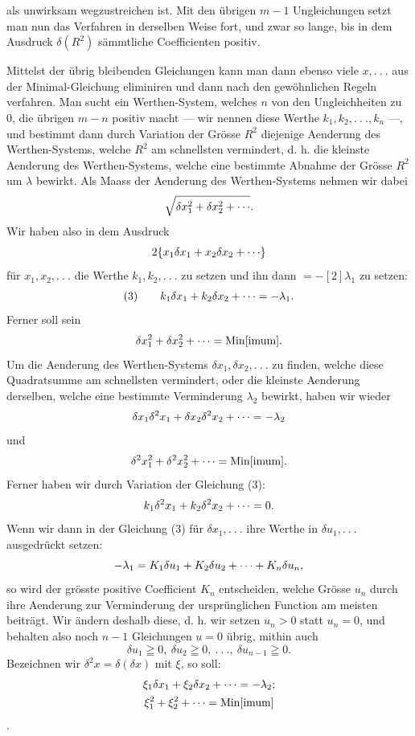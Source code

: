 \clearpage{}
\noindent als unwirksam wegzustreichen ist. Mit den übrigen \(m-1\) Ungleichungen setzt man nun das Verfahren in derselben Weise fort, und zwar so lange, bis in dem Ausdruck \(\delta(R^2)\) sämmtliche Coefficienten positiv.

\indent Mittelst der übrig bleibenden Gleichungen kann man dann ebenso viele \(x,.\ .\ .\) aus der Minimal-Gleichung eliminiren und dann nach den gewöhnlichen Regeln verfahren. Man sucht ein Werthen-System, welches \(n\) von den Ungleichheiten zu 0, die übrigen \(m-n\) positiv macht — wir nennen diese Werthe \(k_1,k_2,.\ .\ .,k_n\) —, und bestimmt dann durch Variation der Grösse \(R^2\) diejenige Aenderung des Werthen-Systems, welche \(R^2\) am schnellsten vermindert, d. h. die kleinste Aenderung des Werthen-Systems, welche eine bestimmte Abnahme der Grösse \(R^2\) um \(\lambda\) bewirkt. Als Maass der Aenderung des Werthen-Systems nehmen wir dabei
\[
\sqrt{\delta x_1^2+\delta x_2^2+\mathinner{\cdotp\cdotp\cdotp}}.
\]
\noindent Wir haben also in dem Ausdruck
\[
2\{x_1\delta x_1+x_2\delta x_2+\mathinner{\cdotp\cdotp\cdotp}\}
\]
\noindent für \(x_1,x_2,.\ .\ .\) die Werthe \(k_1,k_2,.\ .\ .\) zu setzen und ihn dann \(=-[2]\lambda_1\) zu setzen:
\[
\begin{array}{@{}l@{\qquad}l@{}}(3)&k_1\delta x_1+k_2\delta x_2+\mathinner{\cdotp\cdotp\cdotp}=-\lambda_1.\end{array}
\]
\noindent Ferner soll sein
\[
\delta x_1^2+\delta x_2^2+\mathinner{\cdotp\cdotp\cdotp}=\mathrm{Min[imum]}.
\]
\noindent Um die Aenderung des Werthen-Systems \(\delta x_1,\delta x_2,.\ .\ .\) zu finden, welche diese Quadratsumme am schnellsten vermindert, oder die kleinste Aenderung derselben, welche eine bestimmte Verminderung \(\lambda_2\) bewirkt, haben wir wieder
\[
\delta x_1\delta^2x_1+\delta x_2\delta^2x_2+\mathinner{\cdotp\cdotp\cdotp}=-\lambda_2
\]
\noindent und
\[
\delta^2x_1^2+\delta^2x_2^2+\mathinner{\cdotp\cdotp\cdotp}=\mathrm{Min[imum]}.
\]
\noindent Ferner haben wir durch Variation der Gleichung (3):
\[
k_1\delta^2x_1+k_2\delta^2x_2+\mathinner{\cdotp\cdotp\cdotp}=0.
\]
\noindent Wenn wir dann in der Gleichung (3) für \(\delta x_1,.\ .\ .\) ihre Werthe in \(\delta u_1,.\ .\ .\)
\clearpage{}
\noindent ausgedrückt setzen:
\[
-\lambda_1=K_1\delta u_1+K_2\delta u_2+\mathinner{\cdotp\cdotp\cdotp}+K_n\delta u_n,
\]
\noindent so wird der grösste positive Coefficient \(K_n\) entscheiden, welche Grösse \(u_n\) durch ihre Aenderung zur Verminderung der ursprünglichen Function am meisten beiträgt. Wir ändern deshalb diese, d. h. wir setzen \(u_n>0\) statt \(u_n=0\), und behalten also noch \(n-1\) Gleichungen \(u=0\) übrig, mithin auch
\[
\delta u_1\geqq0,\ \delta u_2\geqq0,\ .\ .\ .,\ \delta u_{n-1}\geqq0.
\]
\noindent Bezeichnen wir \(\delta^2x=\delta(\delta x)\) mit \(\xi\), so soll:
\[
\begin{gathered}
\xi_1\delta x_1+\xi_2\delta x_2+\mathinner{\cdotp\cdotp\cdotp}=-\lambda_2;\\
\xi_1^2+\xi_2^2+\mathinner{\cdotp\cdotp\cdotp}=\mathrm{Min[imum]}
\end{gathered}
\]
\noindent [sein].
